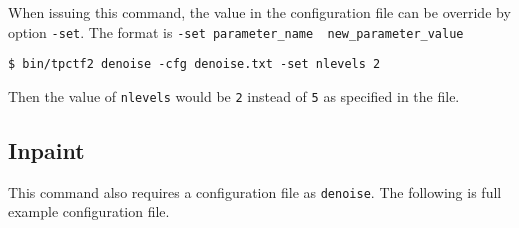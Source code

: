 \documentclass[a4paper,5pt]{article}
\begin{document}
  When issuing this command, the value in the configuration file can be override by option \lstinline{-set}. The format is \lstinline{-set parameter_name  new_parameter_value}
  
  \lstinline{$ bin/tpctf2 denoise -cfg denoise.txt -set nlevels 2 }
  
  Then the value of \lstinline{nlevels} would be \lstinline{2} instead of \lstinline{5} as specified in the file.
  
\subsection{Inpaint}

  This command also requires a configuration file as \lstinline{denoise}. The following is full example configuration file.
  
\end{document}
